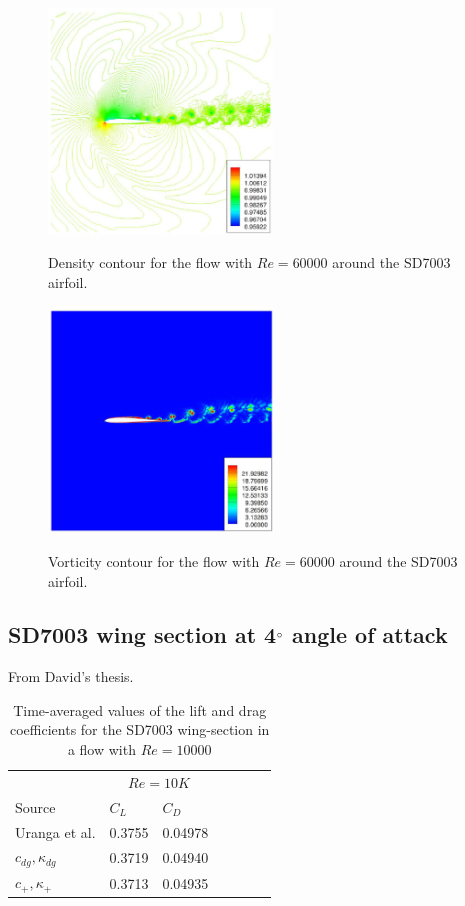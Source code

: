 \begin{figure}
\centering
\includegraphics[height=60mm]{figure_937a} \\
\caption{Density contour for the flow with $Re = 60000$ around the SD7003 airfoil.}
\label{fig:figure_937a}
\end{figure}

\begin{figure}
\centering
\includegraphics[height=60mm]{figure_937b} \\
\caption{Vorticity contour for the flow with $Re = 60000$ around the SD7003 airfoil.}
\label{fig:figure_937b}
\end{figure}


\subsection{SD7003 wing section at 4$^{\circ}$ angle of attack}
From David's thesis.

\begin{table}[H]
\centering
\begin{tabular}{ l| l l| l l| l l} 
  
 &  \multicolumn{2}{|c|}{$Re = 10K$}  \\ 
 Source & $C_L$ & $C_D$    \\ 
\hline
 Uranga et al.\cite{uranga2011implicit} & 0.3755 & 0.04978   \\ 
$c_{dg},\kappa_{dg}$ & 0.3719 & 0.04940  \\ 
$c_{+},\kappa_{+}$ & 0.3713 & 0.04935 \\ 
 \end{tabular}
\caption{Time-averaged values of the lift and drag coefficients for the SD7003 wing-section in a flow with $Re = 10000$}
\label{table:sdWingForce} 
 \end{table}

